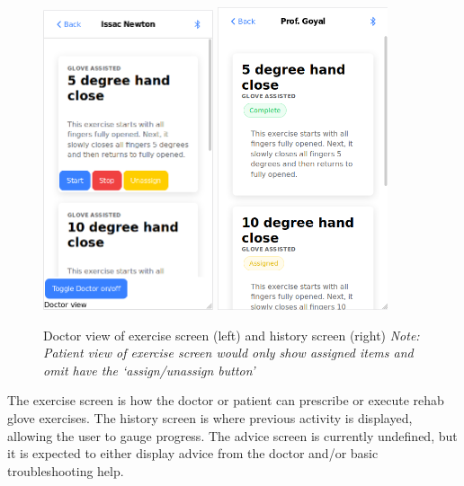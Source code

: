\documentclass[a4paper,10pt]{article}
\begin{document}
            \begin{figure}[H]
            \centering
            \includegraphics[width=50mm, scale=1]{exerciseScreen}
            \includegraphics[width=50mm, scale=1]{history}
            \caption{Doctor view of exercise screen (left) and history screen (right) \textit{Note: Patient view of exercise screen would only show assigned items and omit have the `assign/unassign button'}}
            \end{figure}
                        
            The exercise screen is how the doctor or patient can prescribe or execute rehab glove exercises. The history screen is where previous activity is displayed, allowing the user to gauge progress. The advice screen is currently undefined, but it is expected to either display advice from the doctor and/or basic troubleshooting help.
            
\end{document}
